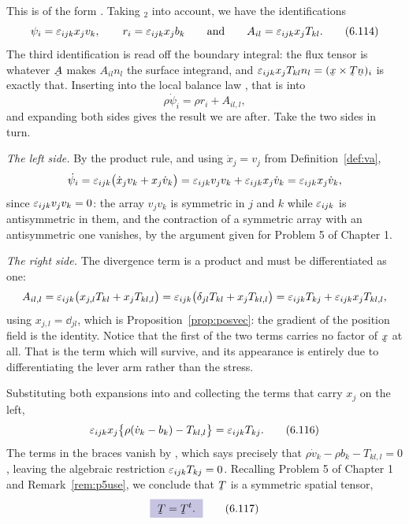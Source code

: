 This is of the form . Taking $_{2}$ into account, we
have the identifications
\begin{equation}
   \psi_{i}=\varepsilon_{ijk}x_{j}v_{k},\qquad
   r_{i}=\varepsilon_{ijk}x_{j}b_{k}
   \qquad\text{and}\qquad
   A_{il}=\varepsilon_{ijk}x_{j}T_{kl} .
   \tag{6.114}\label{eq:6.114}
\end{equation}
The third identification is read off the boundary integral: the flux
tensor is whatever $\bA$ makes $A_{il}n_{l}$ the surface integrand, and
$\eps_{ijk}x_{j}T_{kl}n_{l}=(\bx\times\bT\bn)_{i}$ is exactly that.
Inserting  into the local balance law , that is
into
\begin{equation}
   \rho\dot\psi_{i}=\rho r_{i}+A_{il,l},
   \tag{6.115}\label{eq:6.115}
\end{equation}
and expanding both sides gives the result we are after. Take the two
sides in turn.

\emph{The left side.} By the product rule, and using $\dot x_{j}=v_{j}$
from Definition~\ref{def:va},
\[
   \dot\psi_{i}=\varepsilon_{ijk}\big(\dot x_{j}v_{k}+x_{j}\dot v_{k}\big)
   =\varepsilon_{ijk}v_{j}v_{k}+\varepsilon_{ijk}x_{j}\dot v_{k}
   =\varepsilon_{ijk}x_{j}\dot v_{k},
\]
since $\varepsilon_{ijk}v_{j}v_{k}=0$: the array $v_{j}v_{k}$ is symmetric in
$j$ and $k$ while $\varepsilon_{ijk}$ is antisymmetric in them, and the
contraction of a symmetric array with an antisymmetric one vanishes, by
the argument given for Problem 5 of Chapter 1.

\emph{The right side.} The divergence term is a product and must be
differentiated as one:
\[
   A_{il,l}=\varepsilon_{ijk}\big(x_{j,l}T_{kl}+x_{j}T_{kl,l}\big)
   =\varepsilon_{ijk}\big(\delta_{jl}T_{kl}+x_{j}T_{kl,l}\big)
   =\varepsilon_{ijk}T_{kj}+\varepsilon_{ijk}x_{j}T_{kl,l},
\]
using $x_{j,l}=\dd_{jl}$, which is Proposition~\ref{prop:posvec}: the
gradient of the position field is the identity. Notice that the first
of the two terms carries no factor of $\bx$ at all. That is the term
which will survive, and its appearance is entirely due to
differentiating the lever arm rather than the stress.

Substituting both expansions into  and collecting the terms
that carry $x_{j}$ on the left,
\begin{equation}
   \varepsilon_{ijk}x_{j}\big\{\rho(\dot v_{k}-b_{k})-T_{kl,l}\big\}
   =\varepsilon_{ijk}T_{kj}.
   \tag{6.116}\label{eq:6.116}
\end{equation}
The terms in the braces vanish by , which says precisely
that $\rho\dot v_{k}-\rho b_{k}-T_{kl,l}=0$, leaving the algebraic
restriction $\varepsilon_{ijk}T_{kj}=0$. Recalling Problem 5 of Chapter 1 and
Remark~\ref{rem:p5use}, we conclude that $\bT$ is a symmetric spatial
tensor,
\begin{equation}
   \boxed{\ \bT=\bT^{t}.\ }
   \tag{6.117}\label{eq:6.117}
\end{equation}

